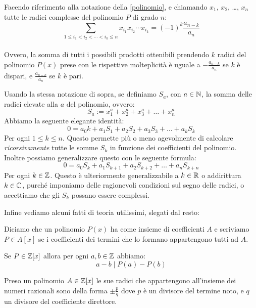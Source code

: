 \documentclass[11pt]{scrartcl}
\begin{document}
	\begin{theorem}[Viète] 
		Facendo riferimento alla notazione della \cref{polinomio}, e chiamando $x_1$, $x_2$, \dots, $x_n$ tutte le radici complesse del polinomio $P$ di grado $n$: 
		$$\sum_{1\le i_1 < i_2 < \cdots < i_k\le n} x_{i_1}x_{i_2}\cdots x_{i_k}=(-1)^k\frac{a_{n-k}}{a_n}$$
		\\ Ovvero, la somma di tutti i possibili prodotti ottenibili prendendo $k$ radici del polinomio $P(x)$ prese con le rispettive molteplicità è uguale a $-\frac{a_{n-k}}{a_n}$ se $k$ è dispari, e $\frac{a_{n-k}}{a_n}$ se $k$ è pari.
		
	\end{theorem}
	\begin{theorem} 
		Usando la stessa notazione di sopra, se definiamo $S_a$, con $a\in\mathbb N$, la somma delle radici elevate alla $a$ del polinomio, ovvero:
		$$S_a:=x_1^a+x_2^a+x_3^a+\dots+x_n^a$$
		Abbiamo la seguente elegante identità:
		$$0=a_0k+a_1S_1+a_2S_2+a_3S_3+\dots+a_kS_k$$
		Per ogni $1\le k \le n$.
		Questo permette più o meno agevolmente di calcolare \textit{ricorsivamente} tutte le somme $S_k$ in funzione dei coefficienti del polinomio.
		\\
		Inoltre possiamo generalizzare questo con le seguente formula:
		$$0=a_0S_k+a_1S_{k+1}+a_2S_{k+2}+\dots+a_nS_{k+n}$$
		Per ogni $k \in \mathbb Z$. Questo è ulteriormente generalizzabile a $k \in \mathbb R$ o addirittura $k \in \mathbb C$, purché imponiamo delle ragionevoli condizioni sul segno delle radici, o accettiamo che gli $S_k$ possano essere complessi.
	\end{theorem}
	Infine vediamo alcuni fatti di teoria utilissimi, slegati dal resto:
	\begin{definition}
		Diciamo che un polinomio $P(x)$ ha come insieme di coefficienti $A$ e scriviamo $P \in A[x]$ se i coefficienti dei termini che lo formano appartengono tutti ad $A$.
	\end{definition}
	\begin{theorem}
		Se $P \in \mathbb Z[x]$ allora per ogni $a,b\in\mathbb Z$ abbiamo:
		$$a-b \mid P(a)-P(b)$$
	\end{theorem}
	\begin{theorem}
		Preso un polinomio $A \in \mathbb Z[x]$ le sue radici che appartengono all'insieme dei numeri razionali sono della forma $\pm\frac{p}{q}$ dove $p$ è un divisore del termine noto, e $q$ un divisore del coefficiente direttore.
	\end{theorem}
	
\end{document}
